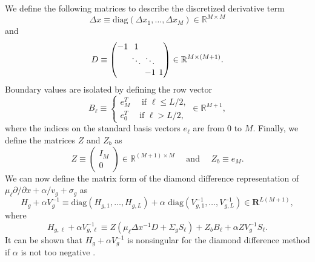 We define the following matrices to describe the discretized derivative term
\begin{equation}
	\Delta x \equiv \text{diag}(\Delta x_{1}, \dots, \Delta x_{M}) \in \mathbb{R}^{M \times M}
\end{equation}
and
\begin{equation}
D \equiv
\setlength\arraycolsep{2pt}
\begin{pmatrix}
-1 & 1 & & \\
& \ddots & \ddots & \\
& & -1 & 1
\end{pmatrix} \in \mathbb{R}^{M \times (M+1)}.
\end{equation}
Boundary values are isolated by defining the row vector
\begin{equation}
	B_{\ell} \equiv \begin{cases}
				e_{M}^{T} \quad \text{ if } \ell \leq L/2, \\
				e_{0}^{T}  \quad \text{ if } \ell > L/2,
                              \end{cases} \in \mathbb{R}^{M+1},
\end{equation}
where the indices on the standard basis vectors $e_{\ell}$ are from 0 to $M$. Finally, we define the matrices $Z$ and $Z_{b}$ as
\begin{equation}
	Z \equiv \begin{pmatrix}
			I_{M} \\
			0
		     \end{pmatrix} \in \mathbb{R}^{(M+1) \times M} \quad \text{ and } \quad
	Z_{b} \equiv  e_{M}.
\end{equation}
We can now define the matrix form of the diamond difference representation of  $\mu_{\ell} \partial/\partial x + \alpha/v_{g} + \sigma_{g}$ as 
\begin{equation}
	H_{g} + \alpha V^{-1}_{g} \equiv \text{diag}(H_{g,1}, \dots, H_{g,L}) + \alpha \text{ diag}(V^{-1}_{g,1}, \dots, V^{-1}_{g,L}) \in \mathbf{R}^{L(M+1)},
\end{equation}
where
\begin{equation}
	H_{g,\ell} + \alpha V^{-1}_{g,\ell} \equiv Z(\mu_{\ell}\Delta x^{-1}D + \Sigma_{g}S_{\ell}) + Z_{b}B_{\ell} + \alpha ZV_{g}^{-1}S_{\ell}.
\end{equation}
It can be shown that $H_{g} + \alpha V^{-1}_{g}$ is nonsingular for the diamond difference method if $\alpha$ is not too negative \cite{greenbaum_iterative_1997}.

